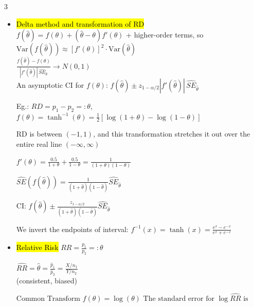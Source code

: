 \documentclass[a4paper,10pt]{article}
\begin{document}
\begin{multicols}{3}
\begin{itemize}
    $\hat{RD} \pm z_{1 - \alpha/2} \hat{SE}_{\hat{RD}}$\\
    (2)Agresti-Caffo interval:\\ \( \tilde{p}_1 = \frac{x + 1}{n_1 + 2} \), \( \tilde{n}_1 = n_1 + 2 \), \( \tilde{p}_2 = \frac{y + 1}{n_2 + 2} \) and \( \tilde{n}_2 = n_2 + 2 \)\\
   $ \hat{SE}_{\hat{RD}} = \left( \frac{\tilde{p}_1(1 - \tilde{p}_1)}{\tilde{n}_1} + \frac{\tilde{p}_2(1 - \tilde{p}_2)}{\tilde{n}_2} \right)^{1/2}
    $
    CI for \( p_1 - p_2 \) is:
    \(
    \hat{RD} \pm z_{1 - \alpha/2} \hat{SE}_{\hat{R}_D}
    \)
    \item \hl{Delta method and transformation of RD}\\
    $f(\hat{\theta}) = f(\theta) + (\hat{\theta} - \theta) f'(\theta)$ + higher-order terms, so $\text{Var}(f(\hat{\theta})) \approx [f'(\theta)]^2 \cdot \text{Var}(\hat{\theta})$\\ $\frac{f(\hat{\theta}) - f(\theta)}{|f'(\hat{\theta})| \, \hat{SE}_{\hat{\theta}}} \to N(0,1)$\\
    An asymptotic CI for \(f(\theta)\):
    $
    f(\hat{\theta}) \pm z_{1-\alpha/2} |f'(\hat{\theta})| \, \hat{SE}_{\hat{\theta}}
    $
    

    Eg.: $RD = p_1 - p_2 =: \theta$, $f(\theta) = \tanh^{-1}(\theta) = \frac{1}{2} \left[\log(1 + \theta) - \log(1 - \theta)\right]$
    
    RD is between $(-1, 1)$, and this transformation stretches it out over the entire real line $(-\infty, \infty)$
    
    $f'(\theta) = \frac{0.5}{1+\theta} + \frac{0.5}{1-\theta} = \frac{1}{(1+\theta)(1-\theta)}$
    
    $\hat{SE}(f(\hat{\theta})) = \frac{1}{(1+\hat{\theta})(1-\hat{\theta})} \hat{SE}_{\hat{\theta}}$
    
    CI:
    $f(\hat{\theta}) \pm \frac{z_{1-\alpha/2}}{(1+\hat{\theta})(1-\hat{\theta})} \hat{SE}_{\hat{\theta}}$
    
    We invert the endpoints of interval: 
    $f^{-1}(x) = \tanh(x) = \frac{e^x - e^{-x}}{e^x + e^{-x}}$

    \item \hl{Relative Risk}
    $RR = \frac{p_1}{p_2} =: \theta$

    $ \hat{RR} = \hat{\theta} = \frac{\hat{p}_1}{\hat{p}_2} = \frac{X / n_1}{Y / n_2}$ \\(consistent, biased)
    
    $\text{Common Transform } f(\theta) = \log(\theta)$
    $\text{The standard error for } \log \hat{RR} \text{ is}$


\end{itemize}
\end{multicols}
\end{document}
